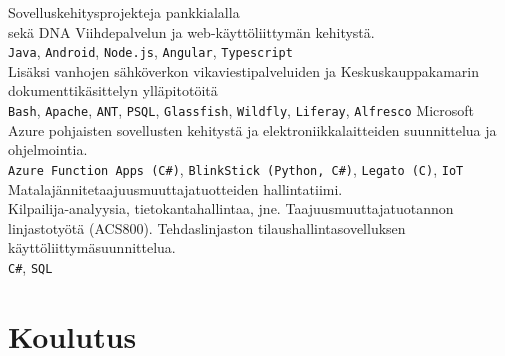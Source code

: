 \documentclass[letterpaper]{twentysecondcv}
\begin{document}
\begin{twenty} %
    {Sovelluskehitysprojekteja pankkialalla \\
		sekä DNA Viihdepalvelun ja web-käyttöliittymän kehitystä.\\
		 \texttt{Java}, \texttt{Android}, \texttt{Node.js}, \texttt{Angular}, \texttt{Typescript} \\
	Lisäksi vanhojen sähköverkon vikaviestipalveluiden ja Keskuskauppakamarin dokumenttikäsittelyn ylläpitotöitä\\
     \texttt{Bash}, \texttt{Apache}, \texttt{ANT}, \texttt{PSQL}, \texttt{Glassfish}, \texttt{Wildfly}, \texttt{Liferay}, \texttt{Alfresco}}
    {Microsoft Azure pohjaisten sovellusten kehitystä ja elektroniikkalaitteiden suunnittelua ja ohjelmointia.\\
     \texttt{Azure Function Apps (C\#)}, \texttt{BlinkStick (Python, C\#)}, \texttt{Legato (C)}, \texttt{IoT}}
    {Matalajännitetaajuusmuuttajatuotteiden hallintatiimi.\\
		Kilpailija-analyysia, tietokantahallintaa, jne.}
    {Taajuusmuuttajatuotannon linjastotyötä (ACS800).}
    {Tehdaslinjaston tilaushallintasovelluksen käyttöliittymäsuunnittelua.\\
     \texttt{C\#}, \texttt{SQL}
    }
\end{twenty}




\section{Koulutus}
\end{document}
